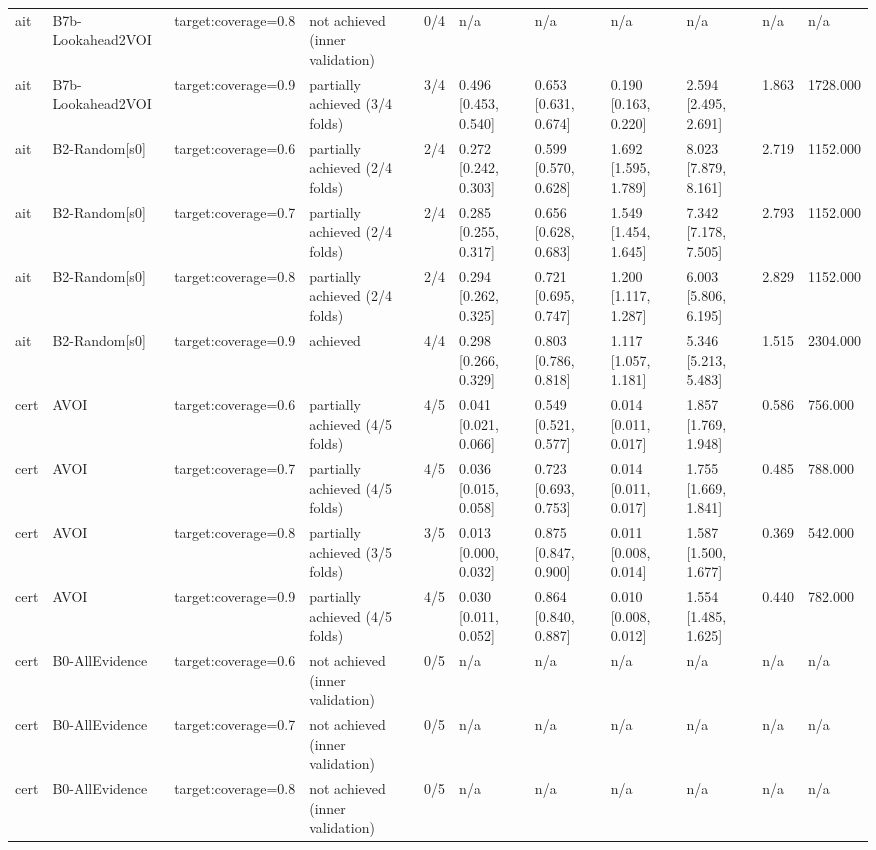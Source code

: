 \begin{table}[!ht]
{\begin{tabular}{lllllllllll}
ait & B7b-Lookahead2VOI & target:coverage=0.8 & not achieved (inner validation) & 0/4 & n/a & n/a & n/a & n/a & n/a & n/a \\
ait & B7b-Lookahead2VOI & target:coverage=0.9 & partially achieved (3/4 folds) & 3/4 & 0.496 [0.453, 0.540] & 0.653 [0.631, 0.674] & 0.190 [0.163, 0.220] & 2.594 [2.495, 2.691] & 1.863 & 1728.000 \\
ait & B2-Random[s0] & target:coverage=0.6 & partially achieved (2/4 folds) & 2/4 & 0.272 [0.242, 0.303] & 0.599 [0.570, 0.628] & 1.692 [1.595, 1.789] & 8.023 [7.879, 8.161] & 2.719 & 1152.000 \\
ait & B2-Random[s0] & target:coverage=0.7 & partially achieved (2/4 folds) & 2/4 & 0.285 [0.255, 0.317] & 0.656 [0.628, 0.683] & 1.549 [1.454, 1.645] & 7.342 [7.178, 7.505] & 2.793 & 1152.000 \\
ait & B2-Random[s0] & target:coverage=0.8 & partially achieved (2/4 folds) & 2/4 & 0.294 [0.262, 0.325] & 0.721 [0.695, 0.747] & 1.200 [1.117, 1.287] & 6.003 [5.806, 6.195] & 2.829 & 1152.000 \\
ait & B2-Random[s0] & target:coverage=0.9 & achieved & 4/4 & 0.298 [0.266, 0.329] & 0.803 [0.786, 0.818] & 1.117 [1.057, 1.181] & 5.346 [5.213, 5.483] & 1.515 & 2304.000 \\
cert & AVOI & target:coverage=0.6 & partially achieved (4/5 folds) & 4/5 & 0.041 [0.021, 0.066] & 0.549 [0.521, 0.577] & 0.014 [0.011, 0.017] & 1.857 [1.769, 1.948] & 0.586 & 756.000 \\
cert & AVOI & target:coverage=0.7 & partially achieved (4/5 folds) & 4/5 & 0.036 [0.015, 0.058] & 0.723 [0.693, 0.753] & 0.014 [0.011, 0.017] & 1.755 [1.669, 1.841] & 0.485 & 788.000 \\
cert & AVOI & target:coverage=0.8 & partially achieved (3/5 folds) & 3/5 & 0.013 [0.000, 0.032] & 0.875 [0.847, 0.900] & 0.011 [0.008, 0.014] & 1.587 [1.500, 1.677] & 0.369 & 542.000 \\
cert & AVOI & target:coverage=0.9 & partially achieved (4/5 folds) & 4/5 & 0.030 [0.011, 0.052] & 0.864 [0.840, 0.887] & 0.010 [0.008, 0.012] & 1.554 [1.485, 1.625] & 0.440 & 782.000 \\
cert & B0-AllEvidence & target:coverage=0.6 & not achieved (inner validation) & 0/5 & n/a & n/a & n/a & n/a & n/a & n/a \\
cert & B0-AllEvidence & target:coverage=0.7 & not achieved (inner validation) & 0/5 & n/a & n/a & n/a & n/a & n/a & n/a \\
cert & B0-AllEvidence & target:coverage=0.8 & not achieved (inner validation) & 0/5 & n/a & n/a & n/a & n/a & n/a & n/a \\

\end{tabular}}
\end{table}
